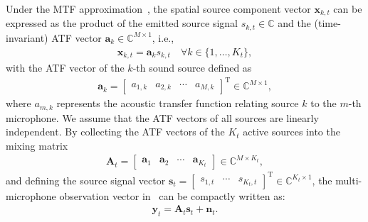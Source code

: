 \documentclass[lettersize,journal]{IEEEtran}
\begin{document}
Under the \gls{MTF} approximation~\cite{avargel_multiplicative_2007}, the spatial source component vector $\mathbf{x}_{k,t}$ can be expressed as the product of the emitted source signal $s_{k,t} \in \mathbb{C}$ and the (time-invariant) \gls{ATF} vector $\mathbf{a}_k \in \mathbb{C}^{M\times 1}$, i.e.,
\begin{align}
  \mathbf{x}_{k,t} = \mathbf{a}_k s_{k,t} \quad \forall k \in \{1, \ldots, K_t\},
  \label{eq:atf_source_component}
\end{align}
with the \gls{ATF} vector of the $k$-th sound source defined as
\begin{align}
  \mathbf{a}_k = \begin{bmatrix} a_{1,k} & a_{2,k} & \cdots & a_{M,k} \end{bmatrix}^{\mathrm{T}} \in \mathbb{C}^{M\times 1},
\end{align}
where $a_{m,k}$ represents the acoustic transfer function relating source $k$ to the $m$-th microphone. We assume that the \gls{ATF} vectors of all sources are linearly independent.
By collecting the \gls{ATF} vectors of the $K_t$ active sources into the mixing matrix
\begin{align}
  \mathbf{A}_t = \begin{bmatrix} \mathbf{a}_1 & \mathbf{a}_2 & \cdots & \mathbf{a}_{K_t} \end{bmatrix} \in \mathbb{C}^{M \times K_t},
\end{align}
and defining the source signal vector $\mathbf{s}_t = \begin{bmatrix} s_{1,t} & \cdots & s_{K_t,t} \end{bmatrix}^{\mathrm{T}} \in \mathbb{C}^{K_t \times 1}$, the multi-microphone observation vector in~ can be compactly written as:
\begin{align}
  \mathbf{y}_t = \mathbf{A}_t \mathbf{s}_t + \mathbf{n}_t.
  \label{eq:matrix_mixture_model}
\end{align}
\end{document}
